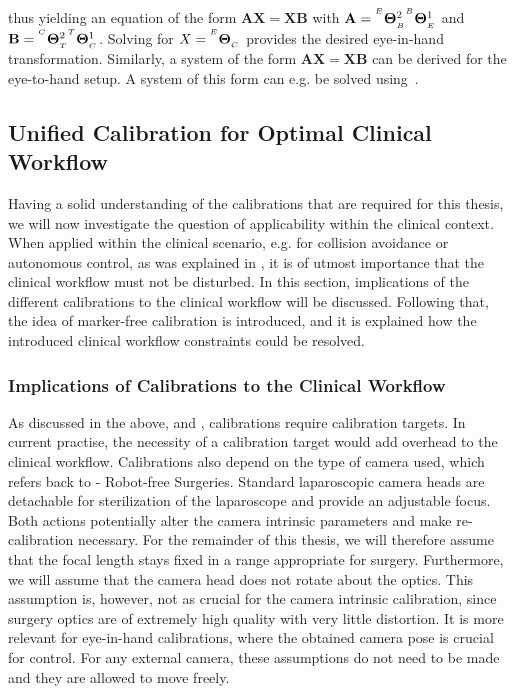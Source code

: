 thus yielding an equation of the form $\mathbf{A}\mathbf{X} = \mathbf{X}\mathbf{B}$ with $\mathbf{A}={}^{^E}\mathbf{\Theta}_{_B}^{2}{}^{^B}\mathbf{\Theta}_{_E}^{1}$ and $\mathbf{B}={}^{^C}\mathbf{\Theta}_{_T}^{2}{}^{^T}\mathbf{\Theta}_{_C}^{1}$. Solving for $X={}^{^E}\mathbf{\Theta}_{_C}$ provides the desired eye-in-hand transformation. Similarly, a system of the form $\mathbf{A}\mathbf{X} = \mathbf{X}\mathbf{B}$ can be derived for the eye-to-hand setup. A system of this form can e.g. be solved using~\cite{tsai1989new, park1994robot, Horaud95}.


\subsection{Unified Calibration for Optimal Clinical Workflow}
\label{in:sec:unified_calibration}
Having a solid understanding of the calibrations that are required for this thesis, we will now investigate the question of applicability within the clinical context. When applied within the clinical scenario, e.g. for collision avoidance or autonomous control, as was explained in , it is of utmost importance that the clinical workflow must not be disturbed. In this section, implications of the different calibrations to the clinical workflow will be discussed. Following that, the idea of marker-free calibration is introduced, and it is explained how the introduced clinical workflow constraints could be resolved.

\subsubsection{Implications of Calibrations to the Clinical Workflow}
\label{in:sec:implications_of_calibrations_to_workflow}
As discussed in the above,  and , calibrations require calibration targets. In current practise, the necessity of a calibration target would add overhead to the clinical workflow. Calibrations also depend on the type of camera used, which refers back to  - Robot-free Surgeries. Standard laparoscopic camera heads are detachable for sterilization of the laparoscope and provide an adjustable focus. Both actions potentially alter the camera intrinsic parameters and make re-calibration necessary. For the remainder of this thesis, we will therefore assume that the focal length stays fixed in a range appropriate for surgery. Furthermore, we will assume that the camera head does not rotate about the optics. This assumption is, however, not as crucial for the camera intrinsic calibration, since surgery optics are of extremely high quality with very little distortion. It is more relevant for eye-in-hand calibrations, where the obtained camera pose is crucial for control. For any external camera, these assumptions do not need to be made and they are allowed to move freely.

